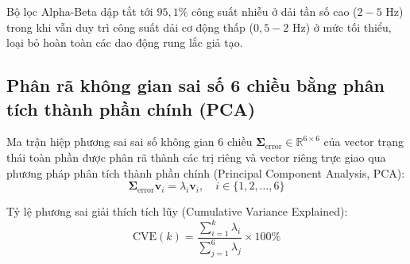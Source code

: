Bộ lọc Alpha-Beta dập tắt tới $95{,}1\%$ công suất nhiễu ở dải tần số cao ($2 - 5$ Hz) trong khi vẫn duy trì công suất dải cơ động thấp ($0{,}5 - 2$ Hz) ở mức tối thiểu, loại bỏ hoàn toàn các dao động rung lắc giả tạo.

\subsection{Phân rã không gian sai số 6 chiều bằng phân tích thành phần chính (PCA)}

\hspace{0.5cm} Ma trận hiệp phương sai sai số không gian 6 chiều $\boldsymbol{\Sigma}_{\text{error}} \in \mathbb{R}^{6 \times 6}$ của vector trạng thái toàn phần được phân rã thành các trị riêng và vector riêng trực giao qua phương pháp phân tích thành phần chính (Principal Component Analysis, PCA):
\begin{equation}
\boldsymbol{\Sigma}_{\text{error}} \mathbf{v}_i = \lambda_i \mathbf{v}_i, \quad i \in \{1, 2, \dots, 6\}
\label{eq:pca-eigenvalue-equation-w15}
\end{equation}

Tỷ lệ phương sai giải thích tích lũy (Cumulative Variance Explained):
\begin{equation}
\text{CVE}(k) = \frac{\sum_{i=1}^k \lambda_i}{\sum_{j=1}^6 \lambda_j} \times 100\%
\label{eq:cumulative-variance-explained-formula-w15}
\end{equation}

\begin{table}[H]
\centering
\caption{Phân tích các thành phần chính của sai số bám bắt trong không gian trạng thái 6 chiều}
\label{tab:pca-error-decomposition-table-w15}
\end{table}

